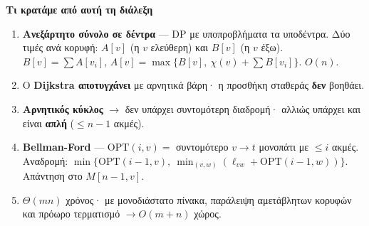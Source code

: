 \documentclass[11pt,a4paper]{article}
\begin{document}
\begin{recapbox}
\textbf{Τι κρατάμε από αυτή τη διάλεξη}
\begin{enumerate}
  \item \textbf{Ανεξάρτητο σύνολο σε δέντρα} --- DP με υποπροβλήματα τα
  υποδέντρα. Δύο τιμές ανά κορυφή: $A[v]$ (η $v$ ελεύθερη) και $B[v]$ (η $v$
  έξω). $B[v] = \sum A[v_i]$, $A[v] = \max\{B[v],\ \chi(v) + \sum B[v_i]\}$.
  $O(n)$.
  \item Ο \textbf{Dijkstra αποτυγχάνει} με αρνητικά βάρη· η προσθήκη σταθεράς
  \textbf{δεν} βοηθάει.
  \item \textbf{Αρνητικός κύκλος} $\to$ δεν υπάρχει συντομότερη διαδρομή·
  αλλιώς υπάρχει και είναι \textbf{απλή} ($\le n-1$ ακμές).
  \item \textbf{Bellman-Ford} --- $\text{OPT}(i, v) = $ συντομότερο $v \to t$
  μονοπάτι με $\le i$ ακμές. Αναδρομή: $\min\{\text{OPT}(i-1,v),\
  \min_{(v,w)}(\ell_{vw} + \text{OPT}(i-1,w))\}$. Απάντηση στο $M[n-1, v]$.
  \item $\Theta(mn)$ χρόνος· με μονοδιάστατο πίνακα, παράλειψη αμετάβλητων
  κορυφών και πρόωρο τερματισμό $\to O(m+n)$ χώρος.
\end{enumerate}
\end{recapbox}

\lecturefooter
\end{document}
